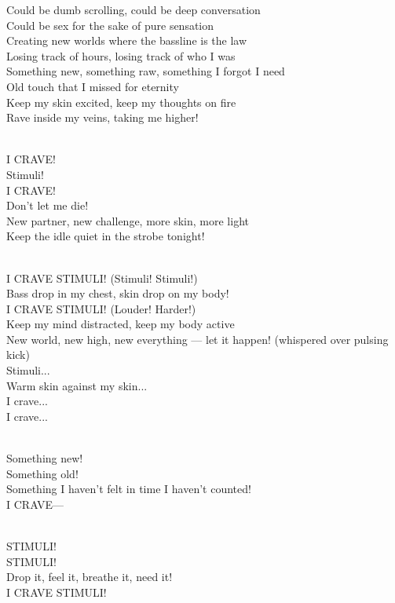 \begin{lyrics}
Could be dumb scrolling, could be deep conversation\\
Could be sex for the sake of pure sensation\\
Creating new worlds where the bassline is the law\\
Losing track of hours, losing track of who I was\\
Something new, something raw, something I forgot I need\\
Old touch that I missed for eternity\\
Keep my skin excited, keep my thoughts on fire\\
Rave inside my veins, taking me higher!

\\
I CRAVE!\\
Stimuli!\\
I CRAVE!\\
Don’t let me die!\\
New partner, new challenge, more skin, more light\\
Keep the idle quiet in the strobe tonight!

\\
I CRAVE STIMULI!
(Stimuli! Stimuli!)\\
Bass drop in my chest, skin drop on my body!\\
I CRAVE STIMULI!
(Louder! Harder!)\\
Keep my mind distracted, keep my body active\\
New world, new high, new everything — let it happen!
(whispered over pulsing kick)\\
Stimuli...\\
Warm skin against my skin...\\
I crave...\\
I crave...

\\
Something new!\\
Something old!\\
Something I haven’t felt in time I haven’t counted!\\
I CRAVE—

\\
STIMULI!\\
STIMULI!\\
Drop it, feel it, breathe it, need it!\\
I CRAVE STIMULI!
\end{lyrics}

